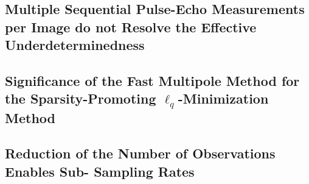 \subsection{Multiple Sequential Pulse-Echo Measurements per Image do not Resolve the Effective Underdeterminedness}
\label{subsec:discussion_ill_conditioning}


%

\subsection{Significance of the Fast Multipole Method for the Sparsity-Promoting $\ell_{q}$-Minimization Method}
\label{subsec:disc_matrix_vector_product}


\subsection{Reduction of the Number of Observations Enables Sub- Sampling Rates}


